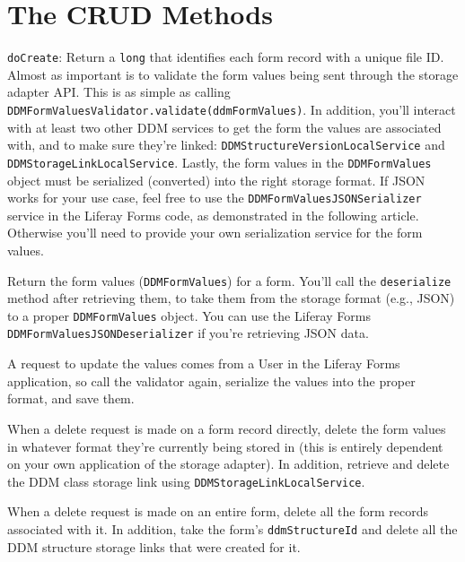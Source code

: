 \section{The CRUD Methods}\label{the-crud-methods}

\texttt{doCreate}: Return a \texttt{long} that identifies each form
record with a unique file ID. Almost as important is to validate the
form values being sent through the storage adapter API. This is as
simple as calling
\texttt{DDMFormValuesValidator.validate(ddmFormValues)}. In addition,
you'll interact with at least two other DDM services to get the form the
values are associated with, and to make sure they're linked:
\texttt{DDMStructureVersionLocalService} and
\texttt{DDMStorageLinkLocalService}. Lastly, the form values in the
\texttt{DDMFormValues} object must be serialized (converted) into the
right storage format. If JSON works for your use case, feel free to use
the \texttt{DDMFormValuesJSONSerializer} service in the Liferay Forms
code, as demonstrated in the following article. Otherwise you'll need to
provide your own serialization service for the form values.

\begin{description}
\tightlist
\item[\texttt{doGetDDMFormValues}]
Return the form values (\texttt{DDMFormValues}) for a form. You'll call
the \texttt{deserialize} method after retrieving them, to take them from
the storage format (e.g., JSON) to a proper \texttt{DDMFormValues}
object. You can use the Liferay Forms
\texttt{DDMFormValuesJSONDeserializer} if you're retrieving JSON data.
\item[\texttt{doUpdate}]
A request to update the values comes from a User in the Liferay Forms
application, so call the validator again, serialize the values into the
proper format, and save them.
\item[\texttt{doDeleteByClass}]
When a delete request is made on a form record directly, delete the form
values in whatever format they're currently being stored in (this is
entirely dependent on your own application of the storage adapter). In
addition, retrieve and delete the DDM class storage link using
\texttt{DDMStorageLinkLocalService}.
\item[\texttt{doDeleteByDDMStrcuture}]
When a delete request is made on an entire form, delete all the form
records associated with it. In addition, take the form's
\texttt{ddmStructureId} and delete all the DDM structure storage links
that were created for it.
\end{description}

